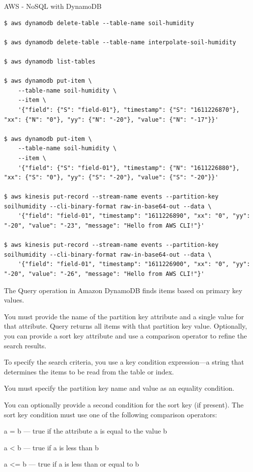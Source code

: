 \begin{frame}{AWS - NoSQL with DynamoDB}
\begin{lstlisting}
$ aws dynamodb delete-table --table-name soil-humidity

$ aws dynamodb delete-table --table-name interpolate-soil-humidity

$ aws dynamodb list-tables

$ aws dynamodb put-item \
    --table-name soil-humidity \
    --item \
    '{"field": {"S": "field-01"}, "timestamp": {"S": "1611226870"}, "xx": {"N": "0"}, "yy": {"N": "-20"}, "value": {"N": "-17"}}'

$ aws dynamodb put-item \
    --table-name soil-humidity \
    --item \
    '{"field": {"S": "field-01"}, "timestamp": {"N": "1611226880"}, "xx": {"S": "0"}, "yy": {"S": "-20"}, "value": {"S": "-20"}}'
    
$ aws kinesis put-record --stream-name events --partition-key soilhumidity --cli-binary-format raw-in-base64-out --data \
    '{"field": "field-01", "timestamp": "1611226890", "xx": "0", "yy": "-20", "value": "-23", "message": "Hello from AWS CLI!"}'

$ aws kinesis put-record --stream-name events --partition-key soilhumidity --cli-binary-format raw-in-base64-out --data \
    '{"field": "field-01", "timestamp": "1611226900", "xx": "0", "yy": "-20", "value": "-26", "message": "Hello from AWS CLI!"}'
\end{lstlisting}



The Query operation in Amazon DynamoDB finds items based on primary key values.

You must provide the name of the partition key attribute and a single value for that attribute. Query returns all items with that partition key value. Optionally, you can provide a sort key attribute and use a comparison operator to refine the search results. 

To specify the search criteria, you use a key condition expression—a string that determines the items to be read from the table or index.

You must specify the partition key name and value as an equality condition.

You can optionally provide a second condition for the sort key (if present). The sort key condition must use one of the following comparison operators:

    a = b — true if the attribute a is equal to the value b

    a < b — true if a is less than b

    a <= b — true if a is less than or equal to b


\end{frame}
